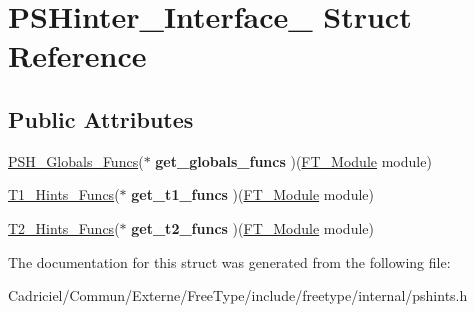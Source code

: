 \hypertarget{struct_p_s_hinter___interface__}{\section{P\-S\-Hinter\-\_\-\-Interface\-\_\- Struct Reference}
\label{struct_p_s_hinter___interface__}
}
\subsection*{Public Attributes}
\begin{DoxyCompactItemize}
\item 
\hypertarget{struct_p_s_hinter___interface___a59c68da021c7c0fadcb8bcc8c9a5ba75}{\hyperlink{struct_p_s_h___globals___funcs_rec__}{P\-S\-H\-\_\-\-Globals\-\_\-\-Funcs}($\ast$ {\bfseries get\-\_\-globals\-\_\-funcs} )(\hyperlink{struct_f_t___module_rec__}{F\-T\-\_\-\-Module} module)}\label{struct_p_s_hinter___interface___a59c68da021c7c0fadcb8bcc8c9a5ba75}

\item 
\hypertarget{struct_p_s_hinter___interface___a9b5405d780efc53df42c3a3e4f8e844b}{\hyperlink{struct_t1___hints___funcs_rec__}{T1\-\_\-\-Hints\-\_\-\-Funcs}($\ast$ {\bfseries get\-\_\-t1\-\_\-funcs} )(\hyperlink{struct_f_t___module_rec__}{F\-T\-\_\-\-Module} module)}\label{struct_p_s_hinter___interface___a9b5405d780efc53df42c3a3e4f8e844b}

\item 
\hypertarget{struct_p_s_hinter___interface___a7ecbd2179450d996111ec51e8d50ecc3}{\hyperlink{struct_t2___hints___funcs_rec__}{T2\-\_\-\-Hints\-\_\-\-Funcs}($\ast$ {\bfseries get\-\_\-t2\-\_\-funcs} )(\hyperlink{struct_f_t___module_rec__}{F\-T\-\_\-\-Module} module)}\label{struct_p_s_hinter___interface___a7ecbd2179450d996111ec51e8d50ecc3}

\end{DoxyCompactItemize}


The documentation for this struct was generated from the following file\-:\begin{DoxyCompactItemize}
\item 
Cadriciel/\-Commun/\-Externe/\-Free\-Type/include/freetype/internal/pshints.\-h\end{DoxyCompactItemize}
